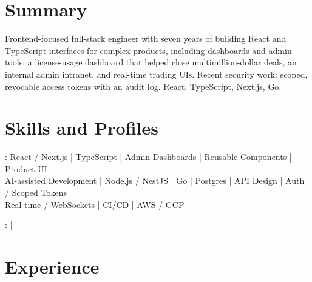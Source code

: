 \documentclass[print]{jack-resume}
\begin{document}
\pagecolor{darkmodeBackground}


\begin{minipage}[t][1cm][t]{.03\textwidth}
    \hfill
\end{minipage}

\section{Summary}
Frontend-focused full-stack engineer with seven years of building React and TypeScript interfaces for complex products, including dashboards and admin tools: a license-usage dashboard that helped close multimillion-dollar deals, an internal admin intranet, and real-time trading UIs. Recent security work: scoped, revocable access tokens with an audit log. React, TypeScript, Next.js, Go.
\sectionsep

\section{Skills and Profiles}
:
React / Next.js \hfill | \hfill
TypeScript \hfill | \hfill
Admin Dashboards \hfill | \hfill
Reusable Components \hfill | \hfill
Product UI \\
\hspace{1.0cm} AI-assisted Development \hfill | \hfill
Node.js / NestJS \hfill | \hfill
Go \hfill | \hfill
Postgres \hfill | \hfill
API Design \hfill | \hfill
Auth / Scoped Tokens \\
\hspace{1.0cm} Real-time / WebSockets \hfill | \hfill
CI/CD \hfill | \hfill
AWS / GCP \\

\raggedright{
    :
      \href{https://www.linkedin.com/in/jack-sturtevant/}{ \ExternalLink} |
     \href{https://github.com/jacksturt}{ \ExternalLink}}

\section{Experience}
\end{document}
